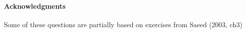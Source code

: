 \documentclass[a4paper]{article}
\begin{document}
\begin{enumerate}
\end{enumerate}


\vfill
\paragraph{Acknowledgments} Some of these questions are partially
based on exercises from Saeed (2003, ch3)
\end{document}
